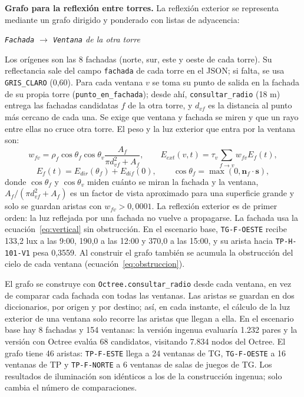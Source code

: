 \documentclass[12pt,a4paper]{article}
\newcommand{\clase}[1]{\texttt{#1}}
\newcommand{\codigo}[1]{\texttt{#1}}
\begin{document}
\textbf{Grafo para la reflexión entre torres.} La reflexión exterior se representa mediante un grafo dirigido y ponderado con listas de adyacencia:
\begin{center}\textit{\clase{Fachada} $\longrightarrow$ \clase{Ventana} de la otra torre}\end{center}
Los orígenes son las 8 fachadas (norte, sur, este y oeste de cada torre). Su reflectancia sale del campo \codigo{fachada} de cada torre en el JSON; si falta, se usa \codigo{GRIS\_CLARO} (0,60). Para cada ventana $v$ se toma su punto de salida en la fachada de su propia torre (\codigo{punto\_en\_fachada}); desde ahí, \codigo{consultar\_radio} (18 m) entrega las fachadas candidatas $f$ de la otra torre, y $d_{vf}$ es la distancia al punto más cercano de cada una. Se exige que ventana y fachada se miren y que un rayo entre ellas no cruce otra torre. El peso y la luz exterior que entra por la ventana son:
\begin{equation}
 w_{fv}=\rho_f\cos\theta_f\cos\theta_v\frac{A_f}{\pi d_{vf}^{2}+A_f},\qquad
 E_{ext}(v,t)=\tau_v\sum_{f\rightarrow v}w_{fv}E_f(t),
 \label{eq:influencia}
\end{equation}
\begin{equation}
 E_f(t)=E_{dir}(\theta_f)+E_{dif}(0),\qquad \cos\theta_f=\max(0,\mathbf n_f\cdot\mathbf s),
 \label{eq:fachada}
\end{equation}
donde $\cos\theta_f$ y $\cos\theta_v$ miden cuánto se miran la fachada y la ventana, $A_f/(\pi d_{vf}^{2}+A_f)$ es un factor de vista aproximado para una superficie grande y solo se guardan aristas con $w_{fv}>0,0001$. La reflexión exterior es de primer orden: la luz reflejada por una fachada no vuelve a propagarse. La fachada usa la ecuación~\ref{eq:vertical} sin obstrucción. En el escenario base, \codigo{TG-F-OESTE} recibe 133,2 lux a las 9:00, 190,0 a las 12:00 y 370,0 a las 15:00, y su arista hacia \codigo{TP-H-101-V1} pesa 0,3559. Al construir el grafo también se acumula la obstrucción del cielo de cada ventana (ecuación~\ref{eq:obstruccion}).

El grafo se construye con \codigo{Octree.consultar\_radio} desde cada ventana, en vez de comparar cada fachada con todas las ventanas. Las aristas se guardan en dos diccionarios, por origen y por destino; así, en cada instante, el cálculo de la luz exterior de una ventana solo recorre las aristas que llegan a ella. En el escenario base hay 8 fachadas y 154 ventanas: la versión ingenua evaluaría 1.232 pares y la versión con Octree evalúa 68 candidatos, visitando 7.834 nodos del Octree. El grafo tiene 46 aristas: \codigo{TP-F-ESTE} llega a 24 ventanas de TG, \codigo{TG-F-OESTE} a 16 ventanas de TP y \codigo{TP-F-NORTE} a 6 ventanas de salas de juegos de TG. Los resultados de iluminación son idénticos a los de la construcción ingenua; solo cambia el número de comparaciones.
\end{document}
